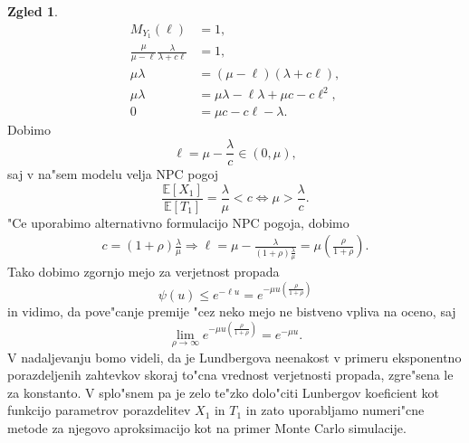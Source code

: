 \documentclass[12pt, a4paper, reqno]{amsart}
\theoremstyle{definition}
\newtheorem{zgled}[definicija]{Zgled}
\theoremstyle{plain}
\newcommand{\E}{\mathbb{E}}
\newcommand{\1}{\mathds{1}}
\begin{document}
\begin{zgled}
                \begin{align*}
                    M_{Y_1}(\ell) &= 1, \\
                    \frac{\mu}{\mu - \ell}\frac{\lambda}{\lambda + c\ell} &= 1, \\
                    \mu\lambda &= (\mu - \ell)(\lambda + c\ell), \\
                    \mu\lambda &= \mu\lambda - \ell\lambda + \mu c - c\ell^2, \\
                    0 &= \mu c - c\ell - \lambda.
                \end{align*}
                Dobimo 
                \begin{equation*}
                    \ell = \mu - \frac{\lambda}{c} \in (0, \mu),
                \end{equation*}
                saj v na"sem modelu velja NPC pogoj
                \begin{equation*}
                    \frac{\E\left[X_1\right]}{\E\left[T_1\right]} = \frac{\lambda}{\mu} < c \iff \mu > \frac{\lambda}{c}.
                \end{equation*}
                "Ce uporabimo alternativno formulacijo NPC pogoja, dobimo
                \begin{align*}
                    c = (1 + \rho)\frac{\lambda}{\mu} \Rightarrow
                    \ell = \mu - \frac{\lambda}{(1 + \rho)\frac{\lambda}{\mu}} = \mu\left(\frac{\rho}{1 + \rho}\right).
                \end{align*}
                Tako dobimo zgornjo mejo za verjetnost propada
                \begin{equation*}
                    \psi(u) \leq e^{-\ell u} = e^{-\mu u\left(\frac{\rho}{1 + \rho}\right)}
                \end{equation*}
                in vidimo, da pove"canje premije "cez neko mejo ne bistveno vpliva na oceno, saj 
                \begin{equation*}
                    \lim_{\rho\to\infty}e^{-\mu u\left(\frac{\rho}{1 + \rho}\right)} = e^{-\mu u}.
                \end{equation*}
                V nadaljevanju bomo videli, da je Lundbergova neenakost v primeru eksponentno 
                porazdeljenih zahtevkov skoraj to"cna vrednost verjetnosti propada, zgre"sena le za konstanto.
                V splo"snem pa je zelo te"zko dolo"citi Lunbergov koeficient kot funkcijo parametrov
                porazdelitev $X_1$ in $T_1$ in zato uporabljamo numeri"cne metode za njegovo aproksimacijo 
                kot na primer Monte Carlo simulacije. 
                \label{zgd:LundebrgovaNeenakostEksponentno}
            \end{zgled}
\end{document}
